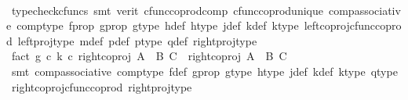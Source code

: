 \begin{isabellebody}
\ \ \ \ \isamarkupfalse%
\ {\isacharparenleft}{\kern0pt}typecheck{\isacharunderscore}{\kern0pt}cfuncs{\isacharcomma}{\kern0pt}\ smt\ {\isacharparenleft}{\kern0pt}verit{\isacharparenright}{\kern0pt}\ cfunc{\isacharunderscore}{\kern0pt}coprod{\isacharunderscore}{\kern0pt}comp\ cfunc{\isacharunderscore}{\kern0pt}coprod{\isacharunderscore}{\kern0pt}unique\ comp{\isacharunderscore}{\kern0pt}associative{}\ comp{\isacharunderscore}{\kern0pt}type\ f{\isacharunderscore}{\kern0pt}prop\ g{\isacharunderscore}{\kern0pt}prop\ g{\isacharunderscore}{\kern0pt}type\ h{\isacharunderscore}{\kern0pt}def\ h{\isacharunderscore}{\kern0pt}type\ j{\isacharunderscore}{\kern0pt}def\ k{\isacharunderscore}{\kern0pt}def\ k{\isacharunderscore}{\kern0pt}type\ left{\isacharunderscore}{\kern0pt}coproj{\isacharunderscore}{\kern0pt}cfunc{\isacharunderscore}{\kern0pt}coprod\ left{\isacharunderscore}{\kern0pt}proj{\isacharunderscore}{\kern0pt}type\ m{\isacharunderscore}{\kern0pt}def\ p{\isacharunderscore}{\kern0pt}def\ p{\isacharunderscore}{\kern0pt}type\ q{\isacharunderscore}{\kern0pt}def\ right{\isacharunderscore}{\kern0pt}proj{\isacharunderscore}{\kern0pt}type{\isacharparenright}{\kern0pt}\isanewline
\ \ \isamarkupfalse%
\ fact{}{\isacharcolon}{\kern0pt}\ {\isachardoublequoteopen}{\isacharparenleft}{\kern0pt}g\ {\isasymcirc}\isactrlsub c\ k{\isacharparenright}{\kern0pt}\ {\isasymcirc}\isactrlsub c\ {\isacharparenleft}{\kern0pt}right{\isacharunderscore}{\kern0pt}coproj\ {\isacharparenleft}{\kern0pt}A\ {\isasymCoprod}\ B{\isacharparenright}{\kern0pt}\ C{\isacharparenright}{\kern0pt}\ {\isacharequal}{\kern0pt}\ {\isacharparenleft}{\kern0pt}right{\isacharunderscore}{\kern0pt}coproj\ {\isacharparenleft}{\kern0pt}A\ {\isasymCoprod}\ B{\isacharparenright}{\kern0pt}\ C{\isacharparenright}{\kern0pt}{\isachardoublequoteclose}\isanewline
\ \ \ \ \isamarkupfalse%
\ {\isacharparenleft}{\kern0pt}smt\ comp{\isacharunderscore}{\kern0pt}associative{}\ comp{\isacharunderscore}{\kern0pt}type\ f{\isacharunderscore}{\kern0pt}def\ g{\isacharunderscore}{\kern0pt}prop\ g{\isacharunderscore}{\kern0pt}type\ h{\isacharunderscore}{\kern0pt}type\ j{\isacharunderscore}{\kern0pt}def\ k{\isacharunderscore}{\kern0pt}def\ k{\isacharunderscore}{\kern0pt}type\ q{\isacharunderscore}{\kern0pt}type\ right{\isacharunderscore}{\kern0pt}coproj{\isacharunderscore}{\kern0pt}cfunc{\isacharunderscore}{\kern0pt}coprod\ right{\isacharunderscore}{\kern0pt}proj{\isacharunderscore}{\kern0pt}type{\isacharparenright}{\kern0pt}\isanewline
\ \ \isamarkupfalse%

\end{isabellebody}
